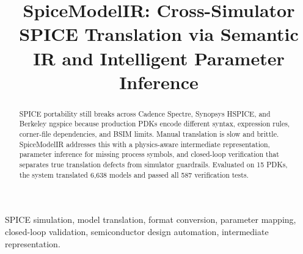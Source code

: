 \documentclass[conference]{IEEEtran}
\begin{document}
\graphicspath{{./figures/}{./biography/}{./}}

\title{SpiceModelIR: Cross-Simulator SPICE Translation via Semantic IR and Intelligent Parameter Inference}


\maketitle

\begin{abstract}
SPICE portability still breaks across Cadence Spectre, Synopsys HSPICE, and Berkeley ngspice because production PDKs encode different syntax, expression rules, corner-file dependencies, and BSIM limits. Manual translation is slow and brittle. SpiceModelIR addresses this with a physics-aware intermediate representation, parameter inference for missing process symbols, and closed-loop verification that separates true translation defects from simulator guardrails. Evaluated on 15 PDKs, the system translated 6,638 models and passed all 587 verification tests.
\end{abstract}

\begin{IEEEkeywords}
SPICE simulation, model translation, format conversion, parameter mapping, closed-loop validation, semiconductor design automation, intermediate representation.
\end{IEEEkeywords}
\end{document}
